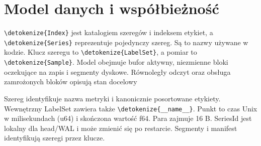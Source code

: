 \documentclass[11pt,a4paper]{article}
\newcommand{\code}[1]{\expandafter\nolinkurl\expandafter{\detokenize{#1}}}
\begin{document}
\section{Model danych i współbieżność}
\label{sec:model}

\code{Index} jest katalogiem szeregów i indeksem etykiet,
a \code{Series} reprezentuje pojedynczy szereg. Są to nazwy używane w kodzie.
Klucz szeregu to \code{LabelSet}, a pomiar to \code{Sample}.
Model obejmuje bufor aktywny, niezmienne bloki oczekujące na zapis
i segmenty dyskowe. Równoległy odczyt oraz obsługa zamrożonych bloków
opisują stan docelowy

Szereg identyfikuje nazwa metryki i kanonicznie posortowane etykiety.
Wewnętrzny LabelSet zawiera także \code{__name__}.
Punkt to czas Unix w milisekundach (u64) i skończona wartość f64.
Para zajmuje 16 B. SeriesId jest lokalny dla head/WAL i może zmienić
się po restarcie. Segmenty i manifest identyfikują szeregi przez klucze.
\end{document}
